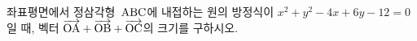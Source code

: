 좌표평면에서 정삼각형~$\mathrm{ABC}$에 내접하는 원의 방정식이 $x^2+y^2-4x+6y-12=0$일 때, 벡터 $\overrightarrow{\mathrm{OA}}+\overrightarrow{\mathrm{OB}}+\overrightarrow{\mathrm{OC}}$의 크기를 구하시오. 
